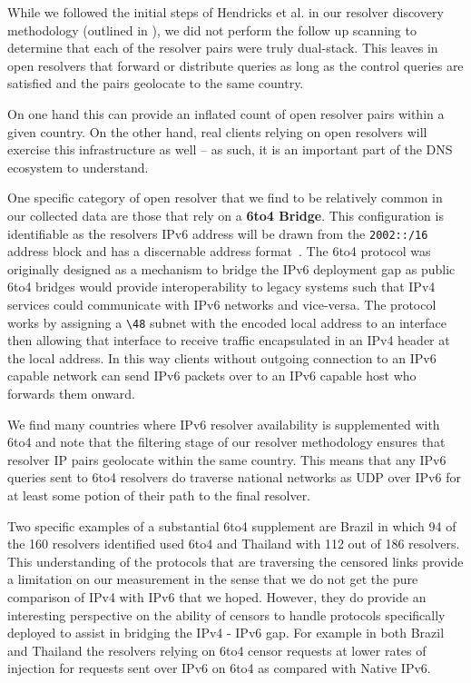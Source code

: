 While we followed the initial steps of Hendricks et al. in our resolver discovery
methodology (outlined in ), we did not perform
the follow up scanning to determine that each of the resolver pairs were truly
dual-stack. This leaves in open resolvers that forward or distribute queries as
long as the control queries are satisfied and the pairs geolocate to the
same country.

On one hand this can provide an inflated count of open resolver pairs within a
given country. On the other hand, real clients relying on open resolvers will
exercise this infrastructure as well -- as such, it is an important part of the DNS
ecosystem to understand.

One specific category of open resolver that we find to be relatively common
in our collected data are those that rely on a \textbf{6to4 Bridge}. This
configuration is identifiable as the resolvers IPv6 address will be drawn from
the \texttt{2002::/16} address
block and has a discernable address format~\cite{RFC3056}.
The 6to4 protocol was originally designed as a mechanism to bridge the IPv6
deployment gap as public 6to4 bridges would provide interoperability
to legacy systems such that IPv4 services could communicate with IPv6
networks and vice-versa. The protocol works by assigning a \texttt{\textbackslash 48} subnet
with the encoded local address to an interface then allowing that
interface to receive traffic encapsulated in an IPv4 header at the local address.
In this way clients without outgoing connection to an IPv6 capable network
can send IPv6 packets over to an IPv6 capable host who forwards them onward.

We find many countries where IPv6 resolver availability is supplemented
with 6to4 and note that the filtering stage of our resolver methodology ensures
that resolver IP pairs geolocate within the same country. This means that any IPv6
queries sent to 6to4 resolvers do traverse national networks as UDP over IPv6 for
at least some potion of their path to the final resolver.

Two specific examples of a substantial 6to4 supplement are Brazil in which 94 of
the 160 resolvers identified used 6to4 and Thailand with 112 out of 186 resolvers. This
understanding of the protocols that are traversing the censored links provide
a limitation on our measurement in the sense that we do not get the pure comparison of
IPv4 with IPv6 that we hoped. However, they do provide an interesting perspective
on the ability of censors to handle protocols specifically deployed to assist in
bridging the IPv4 - IPv6 gap. For example in both Brazil and Thailand the resolvers
relying on 6to4 censor requests at lower rates of injection for requests sent over IPv6 on
6to4 as compared with Native IPv6.


